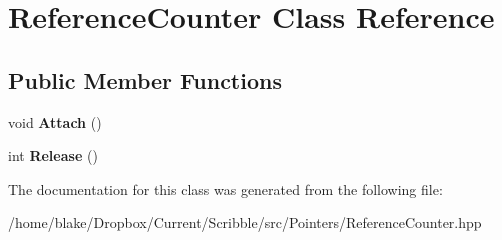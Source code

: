 \hypertarget{class_reference_counter}{\section{Reference\-Counter Class Reference}
\label{class_reference_counter}
}
\subsection*{Public Member Functions}
\begin{DoxyCompactItemize}
\item 
\hypertarget{class_reference_counter_ac4e6dbe4b538bf8c0e280c2a2ade1448}{void {\bfseries Attach} ()}\label{class_reference_counter_ac4e6dbe4b538bf8c0e280c2a2ade1448}

\item 
\hypertarget{class_reference_counter_ab3644ba7521524403601096215945eb2}{int {\bfseries Release} ()}\label{class_reference_counter_ab3644ba7521524403601096215945eb2}

\end{DoxyCompactItemize}


The documentation for this class was generated from the following file\-:\begin{DoxyCompactItemize}
\item 
/home/blake/\-Dropbox/\-Current/\-Scribble/src/\-Pointers/Reference\-Counter.\-hpp\end{DoxyCompactItemize}
